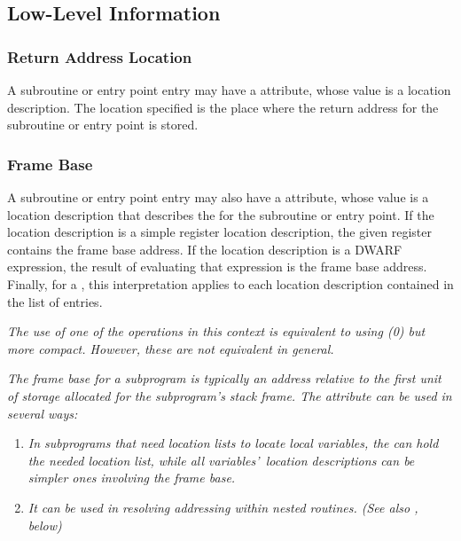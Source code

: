\subsection{Low-Level Information}
\label{chap:lowlevelinformation}

\bbeb
\subsubsection{Return Address Location}
\label{chap:returnaddresslocation}
A\hypertarget{chap:DWATreturnaddrsubroutinereturnaddresssavelocation}{}
subroutine or entry point entry may have a 
\DWATreturnaddrDEFN{}
attribute, whose value is a location description. The location
specified is the place where the return address for the
subroutine or entry point is stored.

\bbeb
\subsubsection{Frame Base}
\label{chap:framebase}
A\hypertarget{chap:DWATframebasesubroutineframebaseaddress}{}
subroutine or entry point entry may also have a
\DWATframebaseDEFN{} attribute, whose value is a location
description that describes the  for the
subroutine or entry point. If the location description is
a simple register location description, the given register
contains the frame base address. If the location description is
a DWARF expression, the result of evaluating that expression
is the frame base address. Finally, for a 
,
this interpretation applies to each location description
contained in the list of  entries.

\textit{The use of one of the \DWOPregn{} 
operations in this context is equivalent to using 
\DWOPbregn(0) but more
compact. However, these are not equivalent in general.}

\textit{The frame base for a subprogram is typically an address
relative to the first unit of storage allocated for the
subprogram\textquoteright s stack frame. The \DWATframebase{} attribute
can be used in several ways:}
\begin{enumerate}[1. ]
\item \textit{In subprograms that need 
location lists to locate local
variables, the \DWATframebase{} can hold the needed location
list, while all variables\textquoteright\  location descriptions can be
simpler ones involving the frame base.}

\item \textit{It can be used in resolving  addressing
within nested routines. 
(See also \DWATstaticlink, below)}
\end{enumerate}

